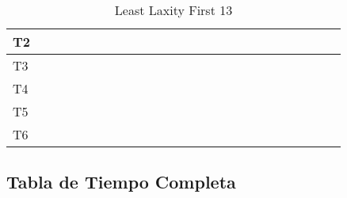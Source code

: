 \documentclass[xcolor=table]{beamer}
\begin{document}
\begin{frame}
\begin{table}
{\begin{tabular}{|l|l|l|l|l|l|l|l|l|l|l|l|l|l|l|l|l|l|l|l|l|l|l|l|l|}
T2 & \cellcolor{purple} & & & \cellcolor{purple} & & & \cellcolor{purple} & & & \cellcolor{purple} & & & \cellcolor{purple} & & & \cellcolor{purple} & & & \cellcolor{purple} & & & \cellcolor{purple} & & \\ \hline 
T3 & & & \cellcolor{cyan} & & & \cellcolor{cyan} & & & \cellcolor{cyan} & & & \cellcolor{cyan} & & & \cellcolor{cyan} & & & \cellcolor{cyan} & & & \cellcolor{cyan} & & & \cellcolor{cyan} \\ \hline 
T4 & & & & & & & & & & & & & & & & & & & & & & & & \\ \hline 
T5 & & & & & & & & & & & & & & & & & & & & & & & & \\ \hline 
T6 & & & & & & & & & & & & & & & & & & & & & & & & \\ \hline 
\end{tabular} 
} 
\caption{ Least Laxity First 13 } 
\end{table} 
\end{frame} 

\subsection{Tabla de Tiempo Completa} 
\end{document}
